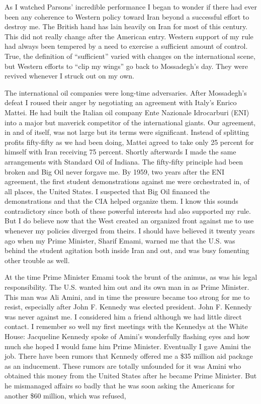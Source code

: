 As I watched Parsons’ incredible performance I began to wonder if there had ever been any coherence to Western policy toward Iran beyond a successful effort to destroy me. The British hand has lain heavily on Iran for most of this century. This did not really change after the American entry. Western support of my rule had always been tempered by a need to exercise a sufficient amount of control. True, the definition of “sufficient” varied with changes on the international scene, but Western efforts to “clip my wings” go back to Mossadegh’s day. They were revived whenever I struck out on my own. 

The international oil companies were long-time adversaries. After Mossadegh’s defeat I roused their anger by negotiating an agreement with Italy’s Enrico Mattei. He had built the Italian oil company Ente Nazionale Idrocarburi (ENI) into a major but maverick competitor of the international giants. Our agreement, in and of itself, was not large but its terms were significant. Instead of splitting profits fifty-fifty as we had been doing, Mattei agreed to take only 25 percent for himself with Iran receiving 75 percent. Shortly afterwards I made the same arrangements with Standard Oil of Indiana. The fifty-fifty principle had been broken and Big Oil never forgave me. By 1959, two years after the ENI agreement, the first student demonstrations against me were orchestrated in, of all places, the United States. I suspected that Big Oil financed the demonstrations and that the CIA helped organize them. I know this sounds contradictory since both of these powerful interests had also supported my rule. But I do believe now that the West created an organized front against me to use whenever my policies diverged from theirs. I should have believed it twenty years ago when my Prime Minister, Sharif Emami, warned me that the U.S. was behind the student agitation both inside Iran and out, and was busy fomenting other trouble as well. 

At the time Prime Minister Emami took the brunt of the animus, as was his legal responsibility. The U.S. wanted him out and its own man in as Prime Minister. This man was Ali Amini, and in time the pressure became too strong for me to resist, especially after John F. Kennedy was elected president. John F. Kennedy was never against me. I considered him a friend although we had little direct contact. I remember so well my first meetings with the Kennedys at the White House: Jacqueline Kennedy spoke of Amini's wonderfully flashing eyes and how much she hoped I would fame him Prime Minister. Eventually I gave Amini the job. There have been rumors that Kennedy offered me a \$35 million aid package as an inducement. These rumors are totally unfounded for it was Amini who obtained this money from the United States after he became Prime Minister. But he mismanaged affairs so badly that he was soon asking the Americans for another \$60 million, which was refused, 

